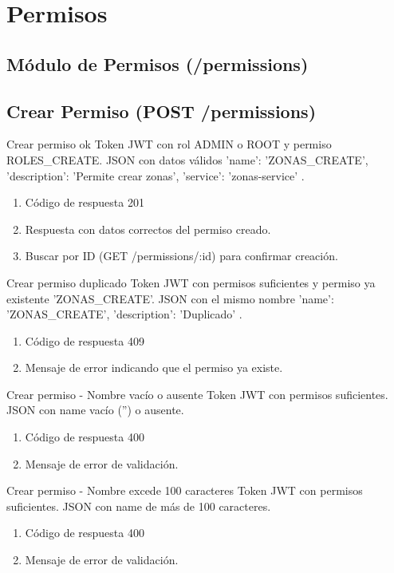 \section{Permisos}
\subsection{Módulo de Permisos (/permissions)}

\subsection{Crear Permiso (POST /permissions)}

{Crear permiso ok}
{Token JWT con rol ADMIN o ROOT y permiso ROLES\_CREATE.}
{JSON con datos válidos { 'name': 'ZONAS\_CREATE', 'description': 'Permite crear zonas', 'service': 'zonas-service' }.}
{\begin{enumerate} [leftmargin=*, nosep]
    \item Código de respuesta 201
    \item Respuesta con datos correctos del permiso creado.
    \item Buscar por ID (GET /permissions/:id) para confirmar creación.
\end{enumerate}}

{Crear permiso duplicado}
{Token JWT con permisos suficientes y permiso ya existente 'ZONAS\_CREATE'.}
{JSON con el mismo nombre { 'name': 'ZONAS\_CREATE', 'description': 'Duplicado' }.}
{\begin{enumerate} [leftmargin=*, nosep]
    \item Código de respuesta 409
    \item Mensaje de error indicando que el permiso ya existe.
\end{enumerate}}

{Crear permiso - Nombre vacío o ausente}
{Token JWT con permisos suficientes.}
{JSON con name vacío ('') o ausente.}
{\begin{enumerate} [leftmargin=*, nosep]
    \item Código de respuesta 400
    \item Mensaje de error de validación.
\end{enumerate}}

{Crear permiso - Nombre excede 100 caracteres}
{Token JWT con permisos suficientes.}
{JSON con name de más de 100 caracteres.}
{\begin{enumerate} [leftmargin=*, nosep]
    \item Código de respuesta 400
    \item Mensaje de error de validación.
\end{enumerate}}

